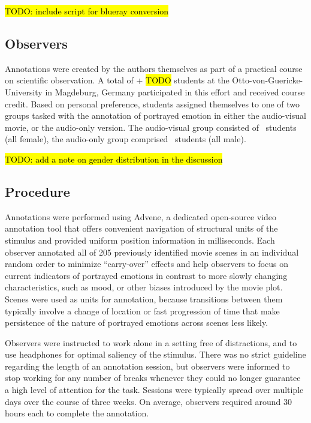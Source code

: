 \hl{TODO: include script for blueray conversion}

\subsection*{Observers}

Annotations were created by the authors themselves as part of a practical
course on scientific observation. A total of \AVTotalRaters +\AOTotalRaters
\hl{TODO} students at the Otto-von-Guericke-University in Magdeburg, Germany
participated in this effort and received course credit.  Based on personal
preference, students assigned themselves to one of two groups tasked with the
annotation of portrayed emotion in either the audio-visual movie, or the
audio-only version. The audio-visual group consisted of \AVTotalRaters\
students (all female), the audio-only group comprised \AOTotalRaters\ students
(all male).

\hl{TODO: add a note on gender distribution in the discussion}

\subsection*{Procedure}

Annotations were performed using Advene\cite{AP2005}, a dedicated open-source
video annotation tool that offers convenient navigation of structural units of
the stimulus and provided uniform position information in milliseconds.  Each
observer annotated all of 205 previously identified movie scenes in an
individual random order to minimize ``carry-over'' effects and help observers
to focus on current indicators of portrayed emotions in contrast to more slowly
changing characteristics, such as mood, or other biases introduced by the movie
plot. Scenes were used as units for annotation, because transitions between
them typically involve a change of location or fast progression of time that
make persistence of the nature of portrayed emotions across scenes less likely.

Observers were instructed to work alone in a setting free of distractions, and
to use headphones for optimal saliency of the stimulus. There was no strict
guideline regarding the length of an annotation session, but observers were
informed to stop working for any number of breaks whenever they could no longer
guarantee a high level of attention for the task. Sessions were typically
spread over multiple days over the course of three weeks. On average, observers
required around 30 hours each to complete the annotation.

